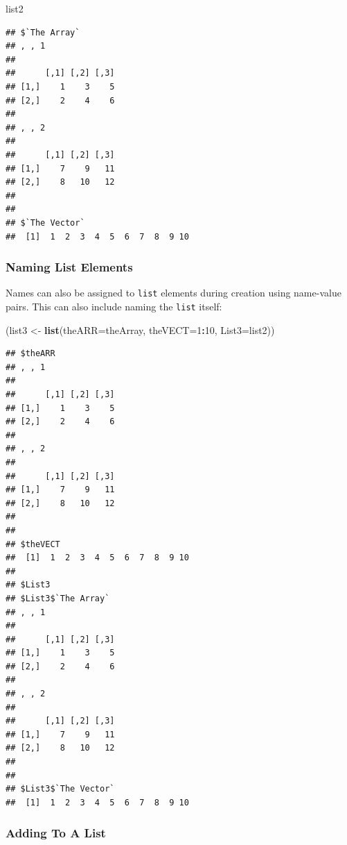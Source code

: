 \documentclass[]{book}
\newenvironment{Shaded}{\begin{snugshade}}{\end{snugshade}}
\newcommand{\DataTypeTok}[1]{\textcolor[rgb]{0.13,0.29,0.53}{#1}}
\newcommand{\DecValTok}[1]{\textcolor[rgb]{0.00,0.00,0.81}{#1}}
\newcommand{\KeywordTok}[1]{\textcolor[rgb]{0.13,0.29,0.53}{\textbf{#1}}}
\newcommand{\NormalTok}[1]{#1}
\newcommand{\OperatorTok}[1]{\textcolor[rgb]{0.81,0.36,0.00}{\textbf{#1}}}
\newcommand{\StringTok}[1]{\textcolor[rgb]{0.31,0.60,0.02}{#1}}
\theoremstyle{definition}
\theoremstyle{definition}
\theoremstyle{definition}
\theoremstyle{remark}
\begin{document}
\begin{Shaded}
\begin{Highlighting}[]
\NormalTok{list2}
\end{Highlighting}
\end{Shaded}

\begin{verbatim}
## $`The Array`
## , , 1
## 
##      [,1] [,2] [,3]
## [1,]    1    3    5
## [2,]    2    4    6
## 
## , , 2
## 
##      [,1] [,2] [,3]
## [1,]    7    9   11
## [2,]    8   10   12
## 
## 
## $`The Vector`
##  [1]  1  2  3  4  5  6  7  8  9 10
\end{verbatim}

\hypertarget{naming-list-elements}{%
\subsubsection{Naming List Elements}\label{naming-list-elements}}

Names can also be assigned to \texttt{list} elements during creation
using name-value pairs. This can also include naming the \texttt{list}
itself:

\begin{Shaded}
\begin{Highlighting}[]
\NormalTok{(list3 <-}\StringTok{ }\KeywordTok{list}\NormalTok{(}\DataTypeTok{theARR=}\NormalTok{theArray, }\DataTypeTok{theVECT=}\DecValTok{1}\OperatorTok{:}\DecValTok{10}\NormalTok{, }\DataTypeTok{List3=}\NormalTok{list2))}
\end{Highlighting}
\end{Shaded}

\begin{verbatim}
## $theARR
## , , 1
## 
##      [,1] [,2] [,3]
## [1,]    1    3    5
## [2,]    2    4    6
## 
## , , 2
## 
##      [,1] [,2] [,3]
## [1,]    7    9   11
## [2,]    8   10   12
## 
## 
## $theVECT
##  [1]  1  2  3  4  5  6  7  8  9 10
## 
## $List3
## $List3$`The Array`
## , , 1
## 
##      [,1] [,2] [,3]
## [1,]    1    3    5
## [2,]    2    4    6
## 
## , , 2
## 
##      [,1] [,2] [,3]
## [1,]    7    9   11
## [2,]    8   10   12
## 
## 
## $List3$`The Vector`
##  [1]  1  2  3  4  5  6  7  8  9 10
\end{verbatim}

\hypertarget{adding-to-a-list}{%
\subsubsection{Adding To A List}\label{adding-to-a-list}}
\end{document}
